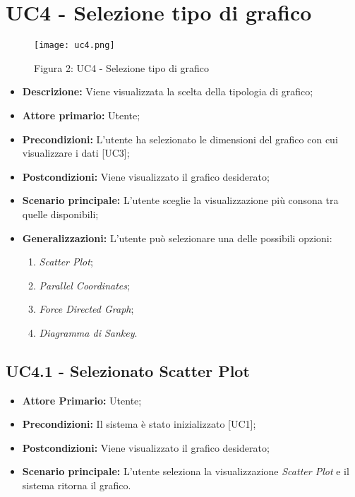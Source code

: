 \section{UC4 - Selezione tipo di grafico}
\begin{figure}[H]
 \texttt{[image: uc4.png]}
 \vspace{-5mm}
 \caption*{Figura 2: UC4 - Selezione tipo di grafico}
\end{figure}

 \begin{itemize}
     \item \textbf{Descrizione:} Viene visualizzata la scelta della tipologia di grafico;
     \item \textbf{Attore primario:} Utente;
     \item \textbf{Precondizioni:} L'utente ha selezionato le dimensioni del grafico con cui visualizzare i dati [UC3];
     \item \textbf{Postcondizioni:} Viene visualizzato il grafico desiderato;
     \item \textbf{Scenario principale:} L'utente sceglie la visualizzazione più consona tra quelle disponibili;
     \item \textbf{Generalizzazioni:} L'utente può selezionare una delle possibili opzioni:
     \begin{enumerate}
         \item \textit{Scatter Plot};
         \item \textit{Parallel Coordinates};
         \item \textit{Force Directed Graph};
         \item \textit{Diagramma di Sankey}.
     \end{enumerate}
 \end{itemize}

 \subsection{UC4.1 - Selezionato Scatter Plot}
 \begin{itemize}
     \item \textbf{Attore Primario:} Utente;
     \item \textbf{Precondizioni:} Il sistema è stato inizializzato [UC1];
     \item \textbf{Postcondizioni:} Viene visualizzato il grafico desiderato;
     \item \textbf{Scenario principale:} L'utente seleziona la visualizzazione \textit{Scatter Plot} e il sistema ritorna il grafico.
 \end{itemize}

